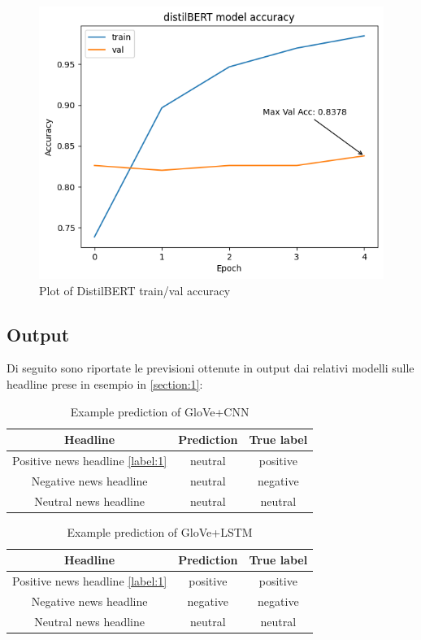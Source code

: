 \begin{figure}[!ht]
    \centering
    \includegraphics[width=12cm]{./images/plot_distilBERT.png}
    \caption{Plot of DistilBERT train/val accuracy}
\end{figure}

\newpage

\subsection{Output}
Di seguito sono riportate le previsioni ottenute in output dai relativi modelli sulle headline prese in esempio in \ref{section:1}:
    \begin{table}[!ht]
    \centering
    \caption{Example prediction of GloVe+CNN}
    \begin{tabular}{ccc}
      \toprule
          Headline &  Prediction & True label \\
          \midrule
          Positive news headline \ref{label:1} & neutral & positive \\
          Negative news headline & neutral & negative \\
          Neutral news headline & neutral & neutral \\
          \bottomrule
    \end{tabular}
  \end{table}

    \begin{table}[!ht]
    \centering
    \caption{Example prediction of GloVe+LSTM}
    \begin{tabular}{ccc}
      \toprule
          Headline &  Prediction & True label \\
          \midrule
          Positive news headline \ref{label:1} & positive & positive \\
          Negative news headline & negative & negative \\
          Neutral news headline & neutral & neutral \\
          \bottomrule
    \end{tabular}
  \end{table}

